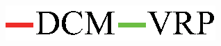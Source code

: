 \documentclass[twocolumn]{jsarticle}
\begin{document}
\begin{figure}[b]
\begin{minipage}{0.333\hsize}
        \hspace{2mm}
      \end{minipage}
  \begin{minipage}{0.2\linewidth}
    \centering
    \includegraphics[width=1.0\linewidth]{./fig/key2.eps}
  \end{minipage}
   \begin{minipage}{0.333\hsize}
        \hspace{2mm}
      \end{minipage}
    

\end{figure}
\end{document}
